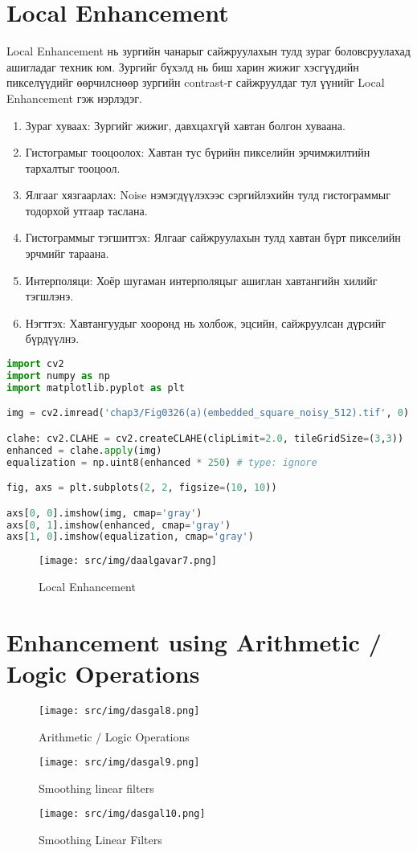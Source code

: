 \newpage
\section{Local Enhancement}
Local Enhancement нь зургийн чанарыг сайжруулахын тулд зураг боловсруулахад
ашигладаг техник юм. Зургийг бүхэлд нь биш харин жижиг хэсгүүдийн
пикселүүдийг өөрчилснөөр зургийн contrast-г сайжруулдаг тул үүнийг Local Enhancement гэж нэрлэдэг.

\begin{enumerate}
    \item Зураг хуваах: Зургийг жижиг, давхцахгүй хавтан болгон хуваана.
    \item Гистограмыг тооцоолох: Хавтан тус бүрийн пикселийн эрчимжилтийн тархалтыг тооцоол.
    \item Ялгааг хязгаарлах: Noise нэмэгдүүлэхээс сэргийлэхийн тулд гистограммыг тодорхой утгаар таслана.
    \item Гистограммыг тэгшитгэх: Ялгааг сайжруулахын тулд хавтан бүрт пикселийн эрчмийг тараана.
    \item Интерполяци: Хоёр шугаман интерполяцыг ашиглан хавтангийн хилийг тэгшлэнэ.
    \item Нэгтгэх: Хавтангуудыг хооронд нь холбож, эцсийн, сайжруулсан дүрсийг бүрдүүлнэ.
\end{enumerate}


\begin{lstlisting}[language=Python, caption=Local Enhancement, frame=single]
import cv2
import numpy as np
import matplotlib.pyplot as plt

img = cv2.imread('chap3/Fig0326(a)(embedded_square_noisy_512).tif', 0)

clahe: cv2.CLAHE = cv2.createCLAHE(clipLimit=2.0, tileGridSize=(3,3))
enhanced = clahe.apply(img)
equalization = np.uint8(enhanced * 250) # type: ignore

fig, axs = plt.subplots(2, 2, figsize=(10, 10))

axs[0, 0].imshow(img, cmap='gray')
axs[0, 1].imshow(enhanced, cmap='gray')
axs[1, 0].imshow(equalization, cmap='gray')
\end{lstlisting}


\begin{figure}[h!]
    \centering
    \texttt{[image: src/img/daalgavar7.png]}
    \caption{Local Enhancement}
\end{figure}

\section[OR/AND]{Enhancement using Arithmetic / Logic Operations}
\begin{figure}[h!]
    \centering
    \texttt{[image: src/img/dasgal8.png]}
    \caption{Arithmetic / Logic Operations}
\end{figure}

\begin{figure}[h!]
    \centering
    \texttt{[image: src/img/dasgal9.png]}
    \caption{Smoothing linear filters}
\end{figure}

\begin{figure}[h!]
    \centering
    \texttt{[image: src/img/dasgal10.png]}
    \caption{Smoothing Linear Filters}
\end{figure}